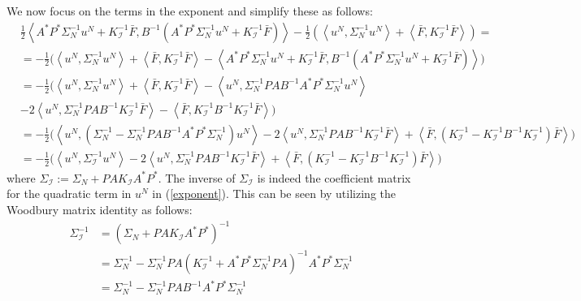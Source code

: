 We now focus on the terms in the exponent and simplify these as follows:
\begin{align}
    &\frac{1}{2}\left\langle A^{*}P^{*}\Sigma_{N}^{-1}u^{N} + K_{\mathcal{I}}^{-1}\bar{F}, B^{-1}\left(A^{*}P^{*}\Sigma_{N}^{-1}u^{N} + K_{\mathcal{I}}^{-1}\bar{F}\right) \right\rangle -\frac{1}{2}\left(\left\langle u^{N}, \Sigma_{N}^{-1}u^{N}\right\rangle + \left\langle \bar{F},K_{\mathcal{I}}^{-1}\bar{F} \right\rangle \right) =  \nonumber \\
    &=-\frac{1}{2}\Big( \left\langle u^{N}, \Sigma_{N}^{-1}u^{N}\right\rangle + \left\langle \bar{F}, K_{\mathcal{I}}^{-1}\bar{F} \right\rangle - \left\langle A^{*}P^{*}\Sigma_{N}^{-1}u^{N} + K_{\mathcal{I}}^{-1}\bar{F}, B^{-1}\left(A^{*}P^{*}\Sigma_{N}^{-1}u^{N} + K_{\mathcal{I}}^{-1}\bar{F}\right) \right\rangle \Big) \nonumber \\
    &=-\frac{1}{2}\Big(\left\langle u^{N}, \Sigma_{N}^{-1}u^{N}\right\rangle + \left\langle \bar{F}, K_{\mathcal{I}}^{-1}\bar{F} \right\rangle - \left\langle u^{N},\Sigma_{N}^{-1}PAB^{-1}A^{*}P^{*}\Sigma_{N}^{-1}u^{N} \right\rangle \nonumber \\
    &- 2\left\langle u^{N},\Sigma_{N}^{-1}PAB^{-1}K_{\mathcal{I}}^{-1}\bar{F} \right\rangle - \left\langle \bar{F}, K_{\mathcal{I}}^{-1}B^{-1}K_{\mathcal{I}}^{-1}\bar{F} \right\rangle \Big) \nonumber \\
    &= -\frac{1}{2}\Big( \left\langle u^{N}, (\Sigma_{N}^{-1} - \Sigma_{N}^{-1}PAB^{-1}A^{*}P^{*}\Sigma_{N}^{-1})u^{N} \right\rangle - 2 \left\langle u^{N},\Sigma_{N}^{-1}PAB^{-1}K_{\mathcal{I}}^{-1}\bar{F} \right\rangle + \left\langle \bar{F}, (K_{\mathcal{I}}^{-1}-K_{\mathcal{I}}^{-1}B^{-1}K_{\mathcal{I}}^{-1})\bar{F} \right\rangle \Big) \nonumber \\
    &=-\frac{1}{2}\Big( \left\langle u^{N}, \Sigma_{\mathcal{I}}^{-1}u^{N} \right\rangle - 2 \left\langle u^{N},\Sigma_{N}^{-1}PAB^{-1}K_{\mathcal{I}}^{-1}\bar{F} \right\rangle + \left\langle \bar{F}, (K_{\mathcal{I}}^{-1}-K_{\mathcal{I}}^{-1}B^{-1}K_{\mathcal{I}}^{-1})\bar{F} \right\rangle \Big) \label{exponent}
\end{align}
where $\Sigma_{\mathcal{I}}:=\Sigma_{N} + PAK_{\mathcal{I}}A^{*}P^{*}$. The inverse of $\Sigma_{\mathcal{I}}$ is indeed the coefficient matrix for the quadratic term in $u^{N}$ in (\ref{exponent}). This can be seen by utilizing the Woodbury matrix identity as follows:
\begin{align*}
    \Sigma_{\mathcal{I}}^{-1}&=(\Sigma_{N} + PAK_{\mathcal{I}}A^{*}P^{*})^{-1} \\
    &=\Sigma_{N}^{-1}-\Sigma_{N}^{-1}PA(K_{\mathcal{I}}^{-1}+A^{*}P^{*}\Sigma_{N}^{-1}PA)^{-1}A^{*}P^{*}\Sigma_{N}^{-1} \\
    &=\Sigma_{N}^{-1}-\Sigma_{N}^{-1}PAB^{-1}A^{*}P^{*}\Sigma_{N}^{-1}
\end{align*}
